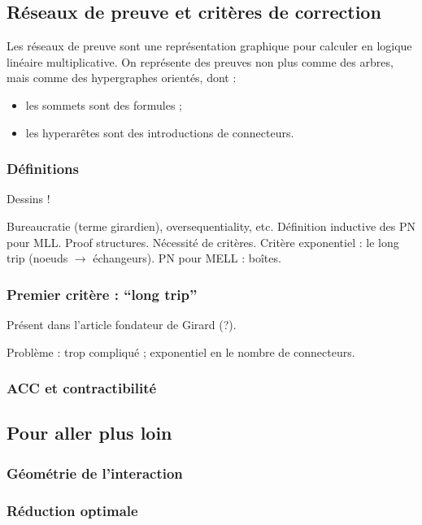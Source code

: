 \documentclass[a4paper, 11pt]{article}
\begin{document}
\subsection{Réseaux de preuve et critères de correction}

Les réseaux de preuve sont une représentation graphique pour calculer en logique linéaire multiplicative. On représente des preuves non plus comme des arbres, mais comme des hypergraphes orientés, dont :
\begin{itemize}
\item les sommets sont des formules ;
\item les hyperarêtes sont des introductions de connecteurs.
\end{itemize}


\subsubsection{Définitions}

Dessins ! 

Bureaucratie (terme girardien), oversequentiality, etc.
Définition inductive des PN pour MLL.
Proof structures.
Nécessité de critères.
Critère exponentiel : le long trip (noeuds $\to$ échangeurs).
PN pour MELL : boîtes.

\subsubsection{Premier critère : \enquote{long trip}}

Présent dans l'article fondateur de Girard (?).

Problème : trop compliqué ; exponentiel en le nombre de connecteurs.

\subsubsection{ACC et contractibilité}

\subsection{Pour aller plus loin}

\subsubsection{Géométrie de l'interaction}

\subsubsection{Réduction optimale}
\end{document}
